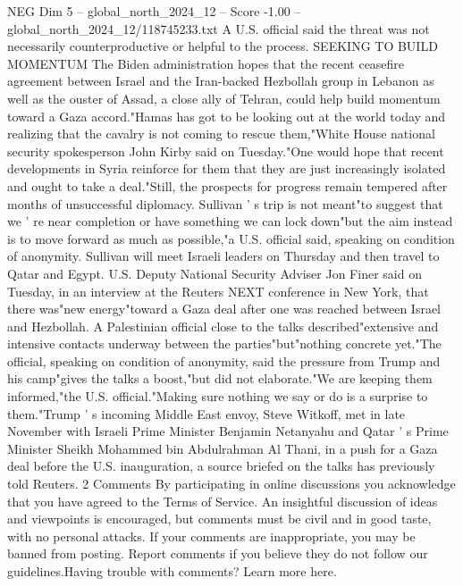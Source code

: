 \begin{textsample}{NEG Dim 5 – global\_north\_2024\_12 – Score -1.00 – global\_north\_2024\_12/118745233.txt}
A U.S. official said the threat was not necessarily counterproductive or helpful to the process.
SEEKING TO BUILD MOMENTUM The Biden administration hopes that the recent ceasefire agreement between Israel and the Iran-backed Hezbollah group in Lebanon as well as the ouster of Assad, a close ally of Tehran, could help build momentum toward a Gaza accord."Hamas has got to be looking out at the world today and realizing that the cavalry is not coming to rescue them,"White House national security spokesperson John Kirby said on Tuesday."One would hope that recent developments in Syria reinforce for them that they are just increasingly isolated and ought to take a deal."Still, the prospects for progress remain tempered after months of unsuccessful diplomacy.
Sullivan ' s trip is not meant"to suggest that we ' re near completion or have something we can lock down"but the aim instead is to move forward as much as possible,"a U.S. official said, speaking on condition of anonymity.
Sullivan will meet Israeli leaders on Thursday and then travel to Qatar and Egypt.
U.S.
Deputy National Security Adviser Jon Finer said on Tuesday, in an interview at the Reuters NEXT conference in New York, that there was"new energy"toward a Gaza deal after one was reached between Israel and Hezbollah.
A Palestinian official close to the talks described"extensive and intensive contacts underway between the parties"but"nothing concrete yet."The official, speaking on condition of anonymity, said the pressure from Trump and his camp"gives the talks a boost,"but did not elaborate."We are keeping them informed,"the U.S. official."Making sure nothing we say or do is a surprise to them."Trump ' s incoming Middle East envoy, Steve Witkoff, met in late November with Israeli Prime Minister Benjamin Netanyahu and Qatar ' s Prime Minister Sheikh Mohammed bin Abdulrahman Al Thani, in a push for a Gaza deal before the U.S. inauguration, a source briefed on the talks has previously told Reuters. 2 Comments By participating in online discussions you acknowledge that you have agreed to the Terms of Service.
An insightful discussion of ideas and viewpoints is encouraged, but comments must be civil and in good taste, with no personal attacks.
If your comments are inappropriate, you may be banned from posting.
Report comments if you believe they do not follow our guidelines.Having trouble with comments?
Learn more here.

\end{textsample}
